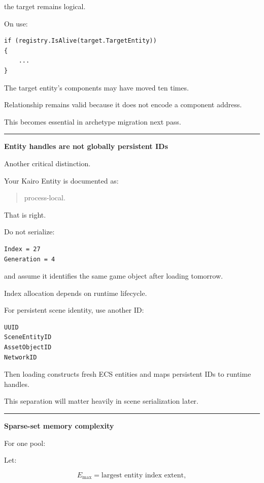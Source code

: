 the target remains logical.

On use:

\begin{verbatim}
if (registry.IsAlive(target.TargetEntity))
{
    ...
}
\end{verbatim}

The target entity's components may have moved ten times.

Relationship remains valid because it does not encode a component address.

This becomes essential in archetype migration next pass.

\begin{center}\rule{0.5\linewidth}{0.5pt}\end{center}

\textbf{Entity handles are not globally persistent IDs}

Another critical distinction.

Your Kairo Entity is documented as:

\begin{quote}
process-local.
\end{quote}

That is right.

Do not serialize:

\begin{verbatim}
Index = 27
Generation = 4
\end{verbatim}

and assume it identifies the same game object after loading tomorrow.

Index allocation depends on runtime lifecycle.

For persistent scene identity, use another ID:

\begin{verbatim}
UUID
SceneEntityID
AssetObjectID
NetworkID
\end{verbatim}

Then loading constructs fresh ECS entities and maps persistent IDs to runtime handles.

This separation will matter heavily in scene serialization later.

\begin{center}\rule{0.5\linewidth}{0.5pt}\end{center}

\textbf{Sparse-set memory complexity}

For one pool:

Let:

\[
E_{\max}
=
\text{largest entity index extent},
\]

